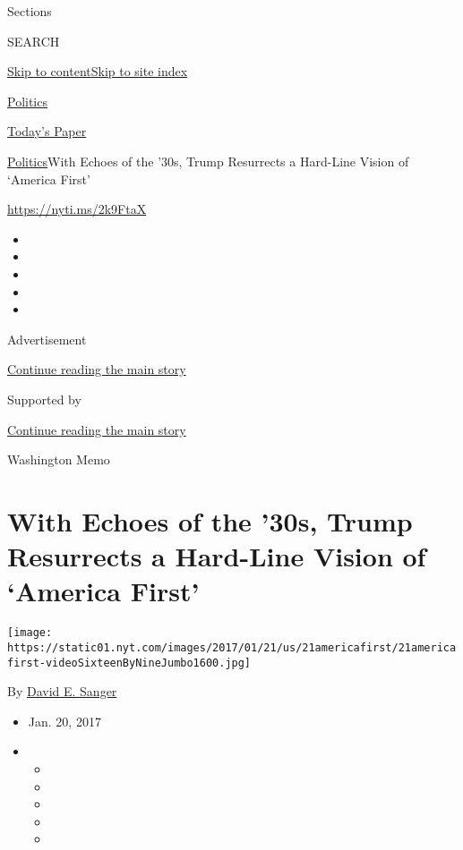 Sections

SEARCH

\protect\hyperlink{site-content}{Skip to
content}\protect\hyperlink{site-index}{Skip to site index}

\href{https://www.nytimes.com/section/politics}{Politics}

\href{https://myaccount.nytimes.com/auth/login?response_type=cookie\&client_id=vi}{}

\href{https://www.nytimes.com/section/todayspaper}{Today's Paper}

\href{/section/politics}{Politics}\textbar{}With Echoes of the '30s,
Trump Resurrects a Hard-Line Vision of `America First'

\url{https://nyti.ms/2k9FtaX}

\begin{itemize}
\item
\item
\item
\item
\item
\end{itemize}

Advertisement

\protect\hyperlink{after-top}{Continue reading the main story}

Supported by

\protect\hyperlink{after-sponsor}{Continue reading the main story}

Washington Memo

\hypertarget{with-echoes-of-the-30s-trump-resurrects-a-hard-line-vision-of-america-first}{%
\section{With Echoes of the '30s, Trump Resurrects a Hard-Line Vision of
`America
First'}\label{with-echoes-of-the-30s-trump-resurrects-a-hard-line-vision-of-america-first}}

\texttt{[image: https://static01.nyt.com/images/2017/01/21/us/21americafirst/21americafirst-videoSixteenByNineJumbo1600.jpg]}

By \href{http://www.nytimes.com/by/david-e-sanger}{David E. Sanger}

\begin{itemize}
\item
  Jan. 20, 2017
\item
  \begin{itemize}
  \item
  \item
  \item
  \item
  \item
  \end{itemize}
\end{itemize}

